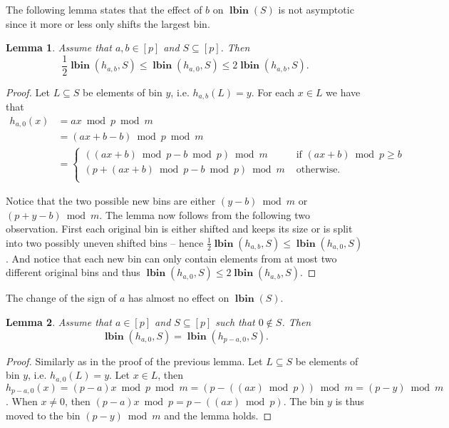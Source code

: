 \documentclass{article}
\newcommand{\lbin}[2]{\operatorname{\mathbf{lbin}}({#1}, {#2})}
\newcommand{\vlbin}[1]{\operatorname{\mathbf{lbin}}({#1})}
\newtheorem{lemma}{Lemma}
\begin{document}
The following lemma states that the effect of $b$ on $\vlbin{S}$ is not asymptotic since it more or less only shifts the largest bin.
\begin{lemma}
\label{lm:b-zero}
Assume that  $a, b \in [p]$ and $S \subseteq [p]$. Then \[ \frac{1}{2} \lbin{h_{a, b}}{S} \leq \lbin{h_{a, 0}}{S} \leq 2\lbin{h_{a, b}}{S} . \]
\end{lemma}
\begin{proof}
Let $L \subseteq S$ be elements of bin $y$, i.e. $h_{a, b}(L) = y$.
For each $x \in L$ we have that 
\begin{align*}
h_{a, 0}(x) 
	& = ax \bmod p \bmod m \\ 
	& = (ax + b - b) \bmod p \bmod m \\ 
	& = \begin{cases}
((ax + b) \bmod p - b \bmod p)\bmod m & \mbox{ if } (ax + b) \bmod p \geq b \\
(p + (ax + b) \bmod p - b \bmod p) \bmod m & \mbox{ otherwise.} \\
\end{cases}
\end{align*}

Notice that the two possible new bins are either $(y - b) \bmod m$ or $(p + y - b) \bmod m$.
The lemma now follows from the following two observation.
First each original bin is either shifted and keeps its size or is split into two possibly uneven shifted bins -- hence $\frac{1}{2} \lbin{h_{a, b}}{S} \leq \lbin{h_{a, 0}}{S}$.
And notice that each new bin can only contain elements from at most two different original bins and thus $\lbin{h_{a, 0}}{S} \leq 2\lbin{h_{a, b}}{S}$.
\end{proof}

The change of the sign of $a$ has almost no effect on $\vlbin{S}$.
\begin{lemma}
\label{lemma:sign-a}
Assume that  $a \in [p]$ and $S \subseteq [p]$ such that $0 \not\in S$. Then \[ \lbin{h_{a, 0}}{S} = \lbin{h_{p - a, 0}}{S} . \]
\end{lemma}
\begin{proof}
Similarly as in the proof of the previous lemma. Let $L \subseteq S$ be elements of bin $y$, i.e. $h_{a, 0}(L) = y$.
Let $x \in L$, then $h_{p - a, 0}(x) = (p - a)x \bmod p \bmod m = (p - ((ax) \bmod p))\bmod m = (p - y) \bmod m$.
When $x \neq 0$, then $(p - a)x \bmod p = p - ((ax) \bmod p)$.
The bin $y$ is thus moved to the bin $(p - y) \bmod m$ and the lemma holds.
\end{proof}
\end{document}
